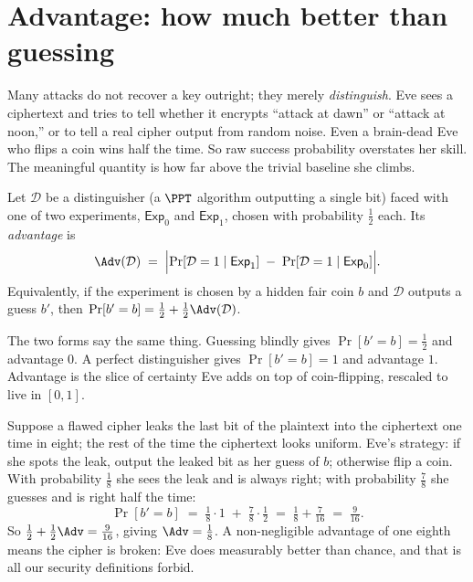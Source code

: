 \section{Advantage: how much better than guessing}
\label{ch08:advantage}

Many attacks do not recover a key outright; they merely \emph{distinguish}. Eve sees a ciphertext and tries to tell whether it encrypts ``attack at dawn'' or ``attack at noon,'' or to tell a real cipher output from random noise. Even a brain-dead Eve who flips a coin wins half the time. So raw success probability overstates her skill. The meaningful quantity is how far above the trivial baseline she climbs.

\begin{definition}
\label{ch08:def-adv}
Let $\mathcal D$ be a distinguisher (a $\PPT$ algorithm outputting a single bit) faced with one of two experiments, $\mathsf{Exp}_0$ and $\mathsf{Exp}_1$, chosen with probability $\tfrac12$ each. Its \emph{advantage} is
\[
\Adv(\mathcal D) \;=\; \Bigl| \Pr[\mathcal D = 1 \mid \mathsf{Exp}_1] \;-\; \Pr[\mathcal D = 1 \mid \mathsf{Exp}_0] \Bigr| .
\]
Equivalently, if the experiment is chosen by a hidden fair coin $b$ and $\mathcal D$ outputs a guess $b'$, then $\Pr[b' = b] = \tfrac12 + \tfrac12\Adv(\mathcal D)$.
\end{definition}

The two forms say the same thing. Guessing blindly gives $\Pr[b'=b]=\tfrac12$ and advantage $0$. A perfect distinguisher gives $\Pr[b'=b]=1$ and advantage $1$. Advantage is the slice of certainty Eve adds on top of coin-flipping, rescaled to live in $[0,1]$.

\begin{example}
\label{ch08:ex-adv}
Suppose a flawed cipher leaks the last bit of the plaintext into the ciphertext one time in eight; the rest of the time the ciphertext looks uniform. Eve's strategy: if she spots the leak, output the leaked bit as her guess of $b$; otherwise flip a coin. With probability $\tfrac18$ she sees the leak and is always right; with probability $\tfrac78$ she guesses and is right half the time:
\[
\Pr[b'=b] \;=\; \tfrac18\cdot 1 \;+\; \tfrac78\cdot\tfrac12 \;=\; \tfrac{1}{8} + \tfrac{7}{16} \;=\; \tfrac{9}{16}.
\]
So $\tfrac12 + \tfrac12\Adv = \tfrac{9}{16}$, giving $\Adv = \tfrac18$. A non-negligible advantage of one eighth means the cipher is broken: Eve does measurably better than chance, and that is all our security definitions forbid.
\end{example}

